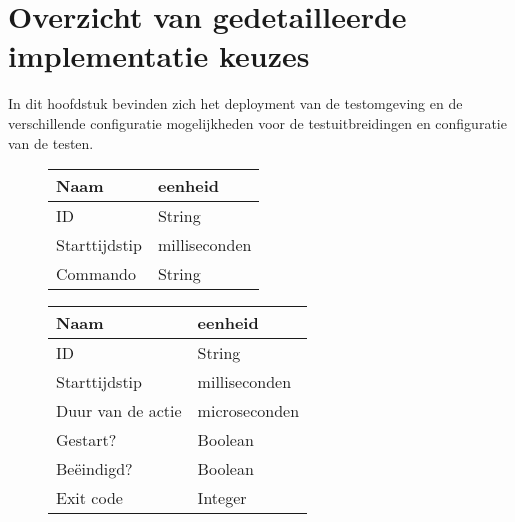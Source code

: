 \chapter{Overzicht van gedetailleerde implementatie keuzes}
In dit hoofdstuk bevinden zich het deployment van de testomgeving en de verschillende configuratie mogelijkheden voor de testuitbreidingen en configuratie van de testen. 
 


\begin{figure}[htbf]

\begin{minipage}[b]{0.4\textwidth}
		\begin{tabular}{l|l}
			\textbf{Naam} & \textbf{eenheid} \\ 
			\hline ID & String \\ 
			Starttijdstip & milliseconden \\ 
			Commando & String \\ 
		\end{tabular} 
	\label{table:beschikbaarheidinput}
\end{minipage}
\hfill
\begin{minipage}[b]{0.5\textwidth}

\begin{tabular}{l|l}
\textbf{Naam} & \textbf{eenheid} \\ 
\hline ID & String \\ 
Starttijdstip & milliseconden \\ 
Duur van de actie & microseconden \\
Gestart? & Boolean \\
Beëindigd? & Boolean \\
Exit code & Integer 
\end{tabular}
\label{table:beschikbaarheidoutput}
\end{minipage}
\end{figure}


